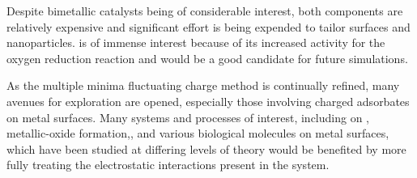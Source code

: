 Despite  bimetallic catalysts being of considerable interest,
both components are relatively expensive and significant effort is being
expended to tailor  surfaces and nanoparticles.
 is of immense interest because of its increased activity for
the oxygen reduction reaction and would be a good candidate for future
simulations.\citep{Sneed:2014fj, Stamenkovic:2007kk, Tuaev:2013fk}

As the multiple minima fluctuating charge method is continually refined, many
avenues for exploration are opened, especially those involving charged
adsorbates on metal surfaces. Many systems and processes of interest, including
 on ,\citep{Xu:2016dz} metallic-oxide
formation,\citep{Streitz:1994mw, Fantauzzi:2014pb, Lloyd:2016jt}, and various
biological molecules on metal surfaces,\citep{Padmos:0qf, Mete:2015rc} which
have been studied at differing levels of theory would be benefited by more
fully treating the electrostatic interactions present in the system. 
